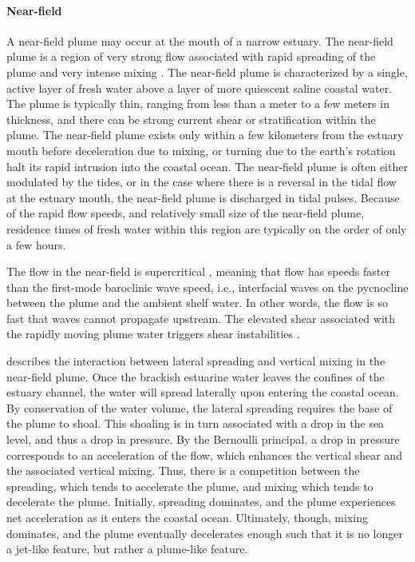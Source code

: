 \documentclass[11pt]{report}
\numberwithin{equation}{section}
\begin{document}
\paragraph{Near-field}
A near-field plume may occur at the mouth of a narrow estuary.  The near-field plume is a region of very strong flow associated with rapid spreading of the plume and very intense mixing \citep{hetland:10a, nash.ea:09, macdonald.geyer:04}.  The near-field plume is characterized by a single, active layer of fresh water above a layer of more quiescent saline coastal water.  The plume is typically thin, ranging from less than a meter to a few meters in thickness, and there can be strong current shear or stratification within the plume.  The near-field plume exists only within a few kilometers from the estuary mouth before deceleration due to mixing, or turning due to the earth's rotation halt its rapid intrusion into the coastal ocean.  The near-field plume is often either modulated by the tides, or in the case where there is a reversal in the tidal flow at the estuary mouth, the near-field plume is discharged in tidal pulses.  Because of the rapid flow speeds, and relatively small size of the near-field plume, residence times of fresh water within this region are typically on the order of only a few hours.

The flow in the near-field is supercritical \citep[see, e.g.,][]{armi.farmer:86}, meaning that flow has speeds faster than the first-mode baroclinic wave speed, i.e., interfacial waves on the pycnocline between the plume and the ambient shelf water.  In other words, the flow is so fast that waves cannot propagate upstream.  The elevated shear associated with the rapidly moving plume water triggers shear instabilities \citep{ivey.imberger:91, macdonald.geyer:05}.

\citet{hetland:10} describes the interaction between lateral spreading and vertical mixing in the near-field plume.  Once the brackish estuarine water leaves the confines of the estuary channel, the water will spread laterally upon entering the coastal ocean.  By conservation of the water volume, the lateral spreading requires the base of the plume to shoal.  This shoaling is in turn associated with a drop in the sea level, and thus a drop in pressure.  By the Bernoulli principal, a drop in pressure corresponds to an acceleration of the flow, which enhances the vertical shear and the associated vertical mixing.  Thus, there is a competition between the spreading, which tends to accelerate the plume, and mixing which tends to decelerate the plume.  Initially, spreading dominates, and the plume experiences net acceleration as it enters the coastal ocean.  Ultimately, though, mixing dominates, and the plume eventually decelerates enough such that it is no longer a jet-like feature, but rather a plume-like feature.
\end{document}
